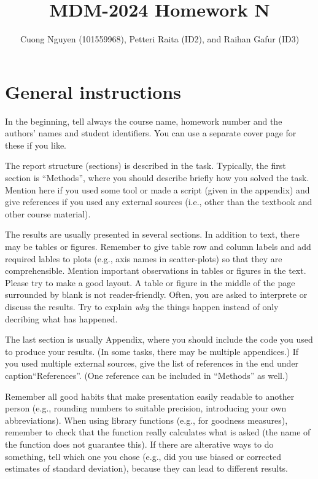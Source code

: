 \documentclass[a4paper,12pt]{article}
\title{MDM-2024 Homework N}
\author{Cuong Nguyen (101559968), Petteri Raita (ID2), and Raihan Gafur (ID3)}
\begin{document}
\maketitle

\section{General instructions}

In the beginning, tell always the course name, homework number and
the authors' names and student identifiers. You can use a separate cover
page for these if you like.

The report structure (sections) is described in the task.  Typically,
the first section is ``Methods'', where you should describe briefly
how you solved the task. Mention here if you used some tool or made a
script (given in the appendix) and give references if you used any
external sources (i.e., other than the textbook and other course
material).

The results are usually presented in several sections. In addition to
text, there may be tables or figures.  Remember to give table row and
column labels and add required lables to plots (e.g., axis names in
scatter-plots) so that they are comprehensible. Mention important
observations in tables or figures in the text. Please try to make a
good layout. A table or figure in the middle of the page surrounded by
blank is not reader-friendly. Often, you are asked to interprete or
discuss the results. Try to explain {\em why} the things happen
instead of only decribing what has happened.

The last section is usually Appendix, where you should include the
code you used to produce your results. (In some tasks, there may be
multiple appendices.) If you used multiple external sources, give the
list of references in the end under caption``References''. (One
reference can be included in ``Methods'' as well.)


Remember all good habits that make presentation easily readable to
another person (e.g., rounding numbers to suitable precision,
introducing your own abbreviations). When using library functions
(e.g., for goodness measures), remember to check that the function
really calculates what is asked (the name of the function does not
guarantee this). If there are alterative ways to do something, tell
which one you chose (e.g., did you use biased or corrected estimates
of standard deviation), because they can lead to different results.
\end{document}
